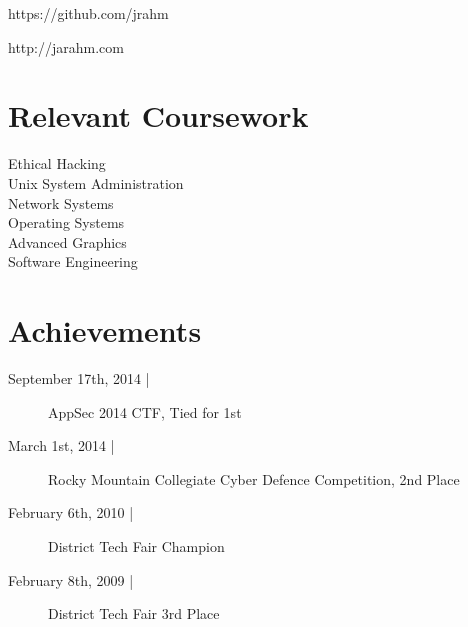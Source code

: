 \documentclass[letterpaper]{deedy-resume} %
\begin{document}
\begin{minipage}[t]{0.33\textwidth}
https://github.com/jrahm


http://jarahm.com

\sectionspace %


\section{Relevant Coursework}

Ethical Hacking \\
Unix System Administration \\
Network Systems \\
Operating Systems \\
Advanced Graphics \\
Software Engineering

\sectionspace %
\section{Achievements} 

\begin{description}
\item[September 17th, 2014 |]
    AppSec 2014 CTF, Tied for 1st
\item[March 1st, 2014 |]
    Rocky Mountain Collegiate Cyber Defence Competition, 2nd Place
\item[February 6th, 2010 |]
    District Tech Fair Champion
\item[February 8th, 2009 |]
    District Tech Fair 3rd Place
\end{description}


\end{minipage} %
\hfill
%
%
\end{document}
